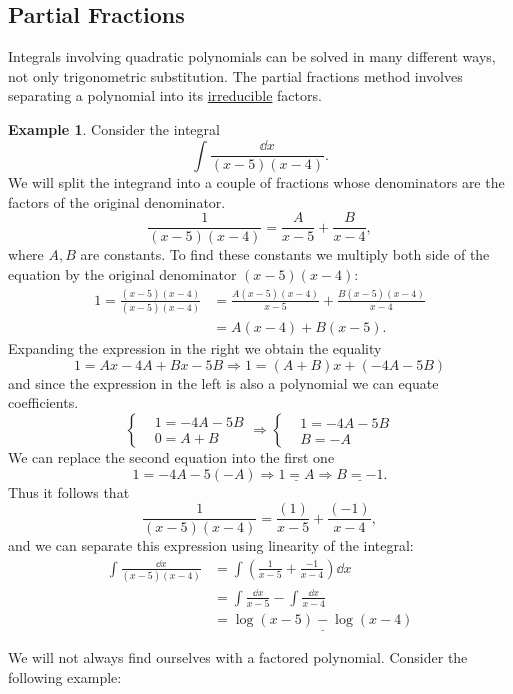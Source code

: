 \documentclass[12pt]{article}
\theoremstyle{plain}
\theoremstyle{definition}
\newtheorem{Ex}[Th]{Example}           %
\theoremstyle{remark}
\renewcommand{\:}{\colon}           %
\newcommand{\un}[1]{\underline{#1}}
\renewcommand{\.}{\Cdot}                %
\newcommand{\To}{\Rightarrow}
\begin{document}
\begin{multicols}{2}
\section*{Partial Fractions}
Integrals involving quadratic polynomials can be solved in many different ways, not only trigonometric substitution. The partial fractions method involves separating a polynomial into its \un{irreducible} factors.
\begin{Ex} 
Consider the integral 
$$\int\frac{\dd x}{(x-5)(x-4)}.$$
We will split the integrand into a couple of fractions whose denominators are the factors of the original denominator.
$$\frac{1}{(x-5)(x-4)}=\frac{A}{x-5}+\frac{B}{x-4},$$
where $A,B$ are constants. To find these constants we multiply both side of the equation by the original denominator $(x-5)(x-4)$:
\begin{align*}
  1=\frac{(x-5)(x-4)}{(x-5)(x-4)}&=\frac{A(x-5)(x-4)}{x-5}+\frac{B(x-5)(x-4)}{x-4}\\
  &=A(x-4)+B(x-5).
\end{align*}
Expanding the expression in the right we obtain the equality
$$1=Ax-4A+Bx-5B\To 1=(A+B)x+(-4A-5B)$$
and since the expression in the left is also a polynomial we can equate coefficients.
$$
\left\lbrace
\begin{aligned}
  &1=-4A-5B\\
  &0=A+B
\end{aligned}
\right.\To
\left\lbrace
\begin{aligned}
  &1=-4A-5B\\
  &B=-A
\end{aligned}
\right.
$$
We can replace the second equation into the first one
$$1=-4A-5(-A)\To\un{1=A}\To \un{B=-1}.$$
Thus it follows that 
$$\frac{1}{(x-5)(x-4)}=\frac{(1)}{x-5}+\frac{(-1)}{x-4},$$
and we can separate this expression using linearity of the integral:
\begin{align*}
  \int\frac{\dd x}{(x-5)(x-4)}&=\int\left(\frac{1}{x-5}+\frac{-1}{x-4}\right)\dd x\\
  &=\int\frac{\dd x}{x-5}-\int\frac{\dd x}{x-4}\\
  &=\un{\log(x-5)-\log(x-4)}
\end{align*}
\end{Ex}

We will not always find ourselves with a factored polynomial. Consider the following example:


\end{multicols}
\end{document}
